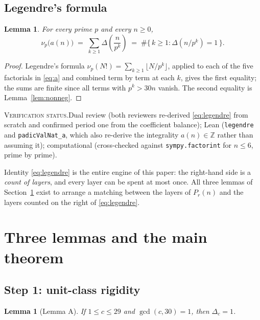\documentclass[11pt]{article}
\theoremstyle{plain}
\newtheorem{lemma}[theorem]{Lemma}
\theoremstyle{definition}
\theoremstyle{remark}
\numberwithin{equation}{section}
\newcommand{\Z}{\mathbb{Z}}
\newcommand{\vstatus}[1]{%
  \par\vspace{3pt}\noindent
  {\small\textsc{Verification status.}\enspace #1}\par\vspace{3pt}}
\begin{document}
\subsection{Legendre's formula}

\begin{lemma}
\label{lem:legendre}
For every prime $p$ and every $n \ge 0$,
\begin{equation}
  \nu_p\bigl(a(n)\bigr) \;=\; \sum_{k \ge 1} \Delta\!\left(\frac{n}{p^k}\right)
  \;=\; \#\bigl\{\, k \ge 1 : \Delta(n/p^k) = 1 \,\bigr\} .
  \label{eq:legendre}
\end{equation}
\end{lemma}

\begin{proof}
Legendre's formula $\nu_p(N!) = \sum_{k \ge 1}\lfloor N/p^k\rfloor$, applied to each of the five
factorials in \eqref{eq:a} and combined term by term at each $k$, gives the first equality; the
sums are finite since all terms with $p^k > 30n$ vanish. The second equality is
Lemma~\ref{lem:nonneg}.
\end{proof}
\vstatus{Dual review (both reviewers re-derived \eqref{eq:legendre} from scratch and confirmed
period one from the coefficient balance); Lean (\texttt{legendre} and \texttt{padicValNat\_a},
which also re-derive the integrality $a(n) \in \Z$ rather than assuming it); computational
(cross-checked against \texttt{sympy.factorint} for $n \le 6$, prime by prime).}

Identity \eqref{eq:legendre} is the entire engine of this paper: the right-hand side is a
\emph{count of layers}, and every layer can be spent at most once. All three lemmas of
Section~\ref{sec:proof} exist to arrange a matching between the layers of $P_r(n)$ and the layers
counted on the right of \eqref{eq:legendre}.

\section{Three lemmas and the main theorem}
\label{sec:proof}

\subsection{Step 1: unit-class rigidity}

\begin{lemma}[Lemma A]
\label{lem:A}
If $1 \le c \le 29$ and $\gcd(c,30) = 1$, then $\Delta_c = 1$.
\end{lemma}
\end{document}
